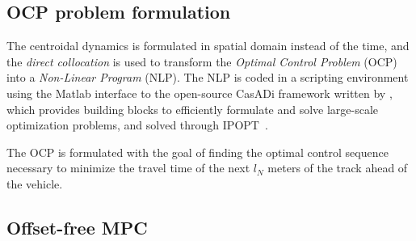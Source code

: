 \documentclass[conference]{IEEEtran} %
\begin{document}


\subsection{OCP problem formulation}

The centroidal dynamics is formulated in spatial domain instead of the time, and the \emph{direct collocation} is used to transform the \emph{Optimal Control Problem} (OCP) into a \emph{Non-Linear Program} (NLP). The NLP is coded in a scripting environment using the Matlab interface to the open-source CasADi framework written by \citet{Andersson2019}, which provides building
blocks to efficiently formulate and solve large-scale optimization problems, and solved through IPOPT~\cite{Wachter2006}.

The OCP is formulated with the goal of finding the optimal control sequence necessary to minimize the travel time of the next $l_N$ meters of the track ahead of the vehicle.

\subsection{Offset-free MPC}
\label{sec:offsetfree}


\end{document}
